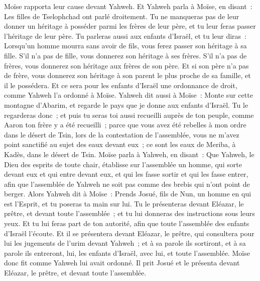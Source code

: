 \begin{multicols}{2}
Moïse rapporta leur cause devant Yahweh.
Et Yahweh parla à Moïse, en disant~:
Les filles de Tselophchad ont parlé droitement. Tu ne manqueras pas de leur donner un héritage à posséder parmi les frères de leur père, et tu leur feras passer l'héritage de leur père.
Tu parleras aussi aux enfants d'Israël, et tu leur diras~: Lorsqu'un homme mourra sans avoir de fils, vous ferez passer son héritage à sa fille.
S'il n'a pas de fille, vous donnerez son héritage à ses frères.
S'il n'a pas de frères, vous donnerez son héritage aux frères de son père.
Et si son père n'a pas de frère, vous donnerez son héritage à son parent le plus proche de sa famille, et il le possédera. Et ce sera pour les enfants d'Israël une ordonnance de droit, comme Yahweh l'a ordonné à Moïse.
Yahweh dit aussi à Moïse~: Monte sur cette montagne d'Abarim, et regarde le pays que je donne aux enfants d'Israël.
Tu le regarderas donc~; et puis tu seras toi aussi recueilli auprès de ton peuple, comme Aaron ton frère y a été recueilli~;
parce que vous avez été rebelles à mon ordre dans le désert de Tsin, lors de la contestation de l'assemblée, vous ne m'avez point sanctifié au sujet des eaux devant eux~; ce sont les eaux de Meriba, à Kadès, dans le désert de Tsin.
Moïse parla à Yahweh, en disant~:
Que Yahweh, le Dieu des esprits de toute chair, établisse sur l'assemblée un homme,
qui sorte devant eux et qui entre devant eux, et qui les fasse sortir et qui les fasse entrer, afin que l'assemblée de Yahweh ne soit pas comme des brebis qui n'ont point de berger.
Alors Yahweh dit à Moïse~: Prends Josué, fils de Nun, un homme en qui est l'Esprit, et tu poseras ta main sur lui.
Tu le présenteras devant Eléazar, le prêtre, et devant toute l'assemblée~; et tu lui donneras des instructions sous leurs yeux.
Et tu lui feras part de ton autorité, afin que toute l'assemblée des enfants d'Israël l'écoute.
Et il se présentera devant Eléazar, le prêtre, qui consultera pour lui les jugements de l'urim devant Yahweh~; et à sa parole ils sortiront, et à sa parole ils entreront, lui, les enfants d'Israël, avec lui, et toute l'assemblée.
Moïse donc fit comme Yahweh lui avait ordonné. Il prit Josué et le présenta devant Eléazar, le prêtre, et devant toute l'assemblée.

\end{multicols}
